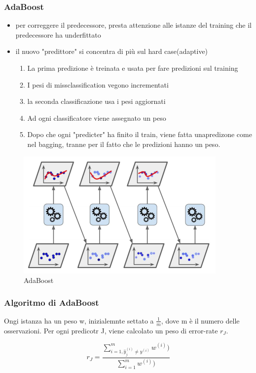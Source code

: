 \subsubsection{AdaBoost}
\begin{itemize}
    \item per correggere il predecessore, presta attenzione alle istanze del training
    che il predecessore ha underfittato
    \item il nuovo "predittore" si concentra di più sul hard case(adaptive)
    \begin{enumerate}
        \item La prima predizione è treinata e usata per fare predizioni sul training
        \item I pesi di missclassification vegono incrementati
        \item la seconda classificazione usa i pesi aggiornati
        \item Ad ogni classificatore viene assegnato un peso
        \item Dopo che ogni "predicter" ha finito il train, viene fatta unapredizone come nel
        bagging, tranne per il fatto che le predizioni hanno un peso.
    \end{enumerate}
\end{itemize}

\begin{figure}[H]
    \centering
    \includegraphics[width=0.3\linewidth]{imgs/ada-boosting}
    \caption{AdaBoost}
    \label{fig:AdaBoost}
\end{figure}

\subsubsection{Algoritmo di AdaBoost}
Ongi istanza ha un peso w,
inizialemnte settato a $\frac{1}{m}$,
dove m è il numero delle osservazioni.
Per ogni predicotr J, viene calcolato un peso di error-rate $r_J$.

\begin{equation}
    r_J = \frac{
        \sum_{i=1, \hat{y}_j^{(i)}\neq y^{(i)}}^{m} w^{(i)})
    }{
        \sum_{i=1}^{m} w^{(i)})
    }
\end{equation}

